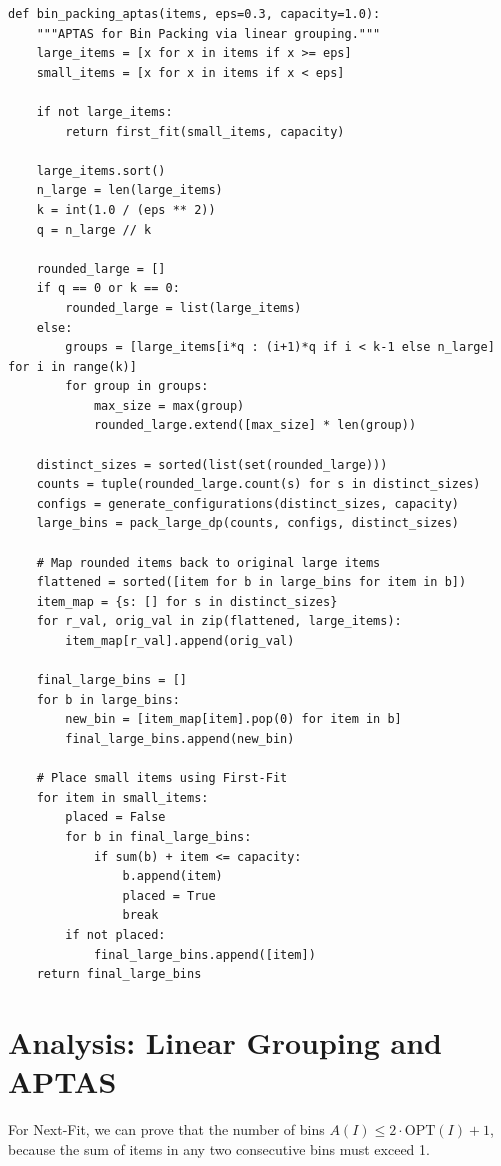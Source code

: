 \documentclass[11pt,oneside]{book}
\begin{document}
\begin{lstlisting}[style=python, caption=Asymptotic PTAS for Bin Packing]
def bin_packing_aptas(items, eps=0.3, capacity=1.0):
    """APTAS for Bin Packing via linear grouping."""
    large_items = [x for x in items if x >= eps]
    small_items = [x for x in items if x < eps]
    
    if not large_items:
        return first_fit(small_items, capacity)
        
    large_items.sort()
    n_large = len(large_items)
    k = int(1.0 / (eps ** 2))
    q = n_large // k
    
    rounded_large = []
    if q == 0 or k == 0:
        rounded_large = list(large_items)
    else:
        groups = [large_items[i*q : (i+1)*q if i < k-1 else n_large] for i in range(k)]
        for group in groups:
            max_size = max(group)
            rounded_large.extend([max_size] * len(group))
            
    distinct_sizes = sorted(list(set(rounded_large)))
    counts = tuple(rounded_large.count(s) for s in distinct_sizes)
    configs = generate_configurations(distinct_sizes, capacity)
    large_bins = pack_large_dp(counts, configs, distinct_sizes)
    
    # Map rounded items back to original large items
    flattened = sorted([item for b in large_bins for item in b])
    item_map = {s: [] for s in distinct_sizes}
    for r_val, orig_val in zip(flattened, large_items):
        item_map[r_val].append(orig_val)
        
    final_large_bins = []
    for b in large_bins:
        new_bin = [item_map[item].pop(0) for item in b]
        final_large_bins.append(new_bin)
        
    # Place small items using First-Fit
    for item in small_items:
        placed = False
        for b in final_large_bins:
            if sum(b) + item <= capacity:
                b.append(item)
                placed = True
                break
        if not placed:
            final_large_bins.append([item])
    return final_large_bins
\end{lstlisting}

\section{Analysis: Linear Grouping and APTAS}
For Next-Fit, we can prove that the number of bins $A(I) \le 2 \cdot \text{OPT}(I) + 1$, because the sum of items in any two consecutive bins must exceed 1.
\end{document}

